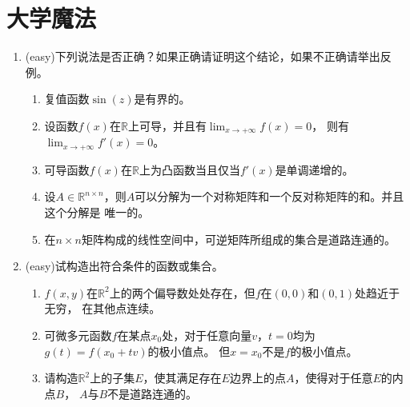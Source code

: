 \documentclass[a4paper]{article}
\begin{document}
\section{大学魔法}
\begin{enumerate}
\item (easy)下列说法是否正确？如果正确请证明这个结论，如果不正确请举出反例。
	\begin{enumerate}
	\item 复值函数$\sin(z)$是有界的。
	\item 设函数$f(x)$在$\mathbb{R}$上可导，并且有$\lim_{x\rightarrow +\infty}f(x)=0$，
	则有$\lim_{x\rightarrow +\infty}f'(x)=0$。
	\item 可导函数$f(x)$在$\mathbb{R}$上为凸函数当且仅当$f'(x)$是单调递增的。
	\item 设$A\in \mathbb{R}^{n\times n}$，则$A$可以分解为一个对称矩阵和一个反对称矩阵的和。并且这个分解是
	唯一的。
	\item 在$n\times n$矩阵构成的线性空间中，可逆矩阵所组成的集合是道路连通的。
	\end{enumerate}
\item (easy)试构造出符合条件的函数或集合。
	\begin{enumerate}
	\item $f(x,y)$在$\mathbb{R}^2$上的两个偏导数处处存在，但$f$在$(0,0)$和$(0,1)$处趋近于无穷，
	在其他点连续。
	\item 可微多元函数$f$在某点$x_0$处，对于任意向量$v$，$t=0$均为$g(t)=f(x_0+tv)$的极小值点。
	但$x=x_0$不是$f$的极小值点。
	\item 请构造$\mathbb{R}^2$上的子集$E$，使其满足存在$E$边界上的点$A$，使得对于任意$E$的内点$B$，
	$A$与$B$不是道路连通的。
	\end{enumerate}


\end{enumerate}
\end{document}
